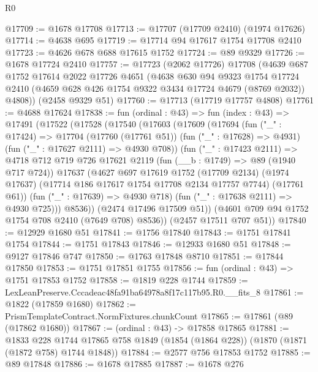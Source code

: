 \begin{lexlean}{R0}
\begin{coremodule}
@17709 := @1678 @17708
@17713 := @17707 (@17709 @2410) (@1974 @17626)
@17714 := @4638 @695
@17719 := @17714 @94 @17617 @1754 @17708 @2410
@17723 := @4626 @678 @688 @17615 @1752
@17724 := @89 @9329
@17726 := @1678 @17724 @2410
@17757 := @17723
    (@2062 @17726)
    @17708
    (@4639
      @687
      @1752
      @17614
      @2022
      @17726
      @4651
      (@4638
        @630
        @94
        @9323
        @1754
        @17724
        @2410
        (@4659 @628 @426 @1754 @9322 @3434 @17724 @4679 (@8769 @2032))
        @4808))
    (@2458 @9329 @51)
@17760 := @17713 (@17719 @17757 @4808)
@17761 := @4688 @17624
@17838 := fun (ordinal : @43) =>
  fun (index : @43) =>
  @17491
    (@17522
      (@17528
        (@17540
          (@17603
            (@17609
              (@17694
                (fun ("_" : @17424) =>
                @17704
                  (@17760 (@17761 @51))
                  (fun ("_" : @17628) => @4931)
                  (fun ("_" : @17627 @2111) => @4930 @708))
                (fun ("_" : @17423 @2111) =>
                @4718
                  @712
                  @719
                  @726
                  @17621
                  @2119
                  (fun (__b : @1749) => @89 (@1940 @717 @724))
                  @17637
                  (@4627
                    @697
                    @17619
                    @1752
                    (@17709 @2134)
                    (@1974 @17637)
                    (@17714 @186 @17617 @1754 @17708 @2134 @17757 @7744)
                    (@17761 @61))
                  (fun ("_" : @17639) => @4930 @718)
                  (fun ("_" : @17638 @2111) => @4930 @725)))
              @8536))
          (@2474 @17496 @17509 @51))
        (@4601 @709 @94 @1752 @1754 @708 @2410 (@7649 @708) @8536))
      (@2457 @17511 @707 @51))
@17840 := @12929 @1680 @51
@17841 := @1756 @17840
@17843 := @1751 @17841 @1754
@17844 := @1751 @17843
@17846 := @12933 @1680 @51
@17848 := @9127 @17846 @747
@17850 := @1763 @17848 @8710
@17851 := @17844 @17850
@17853 := @1751 @17851 @1755
@17856 := fun (ordinal : @43) => @1751 @17853 @1752
@17858 := @1819 @228 @1744
@17859 := LexLeanPreserve.Cccadeac48fa91ba64978a8f17c117b95.R0.__fits_8
@17861 := @1822 (@17859 @1680)
@17862 := PrismTemplateContract.NormFixtures.chunkCount
@17865 := @17861 (@89 (@17862 @1680))
@17867 := (ordinal : @43) -> @17858 @17865
@17881 := @1833
    @228
    @1744
    @17865
    @758
    @1849
    (@1854 (@1864 @228))
    (@1870 (@1871 (@1872 @758) @1744 @1848))
@17884 := @2577 @756 @17853 @1752
@17885 := @89 @17848
@17886 := @1678 @17885
@17887 := @1678 @276

\end{coremodule}
\end{lexlean}
